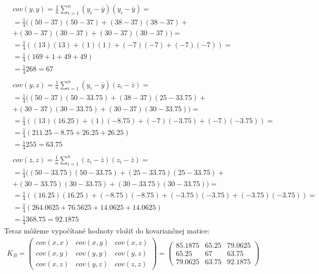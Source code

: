 \documentclass[a4paper]{article}
\begin{document}
	\begin{align*}
		&cov(y,y)=\frac{1}{n}\sum_{i=1}^{n}(y_i-\bar{y})(y_i-\bar{y})=
		\\
		&=\frac{1}{4}((50-37)(50-37)+(38-37)(38-37)+
		\\
		&+(30-37)(30-37)+(30-37)(30-37))=
		\\
		&=\frac{1}{4}((13)(13)+(1)(1)+
		(-7)(-7)+(-7)(-7))=
		\\
		&=\frac{1}{4}(169+1+49+49)
		\\
		&=\frac{1}{4}268=67
		\\
		\\
		&cov(y,z)=\frac{1}{n}\sum_{i=1}^{n}(y_i-\bar{y})(z_i-\bar{z})=
		\\
		&=\frac{1}{4}((50-37)(50-33.75)+(38-37)(25-33.75)+
		\\
		&+(30-37)(30-33.75)+(30-37)(30-33.75))=
		\\
		&=\frac{1}{4}((13)(16.25)+(1)(-8.75)+
		(-7)(-3.75)+(-7)(-3.75))=
		\\
		&=\frac{1}{4}(211.25-8.75+26.25+26.25)
		\\
		&=\frac{1}{4}255=63.75
		\\
		\\
		&cov(z,z)=\frac{1}{n}\sum_{i=1}^{n}(z_i-\bar{z})(z_i-\bar{z})=
		\\
		&=\frac{1}{4}((50-33.75)(50-33.75)+(25-33.75)(25-33.75)+
		\\
		&+(30-33.75)(30-33.75)+(30-33.75)(30-33.75))=
		\\
		&=\frac{1}{4}((16.25)(16.25)+(-8.75)(-8.75)+
		(-3.75)(-3.75)+(-3.75)(-3.75))=
		\\
		&=\frac{1}{4}(264.0625+76.5625+14.0625+14.0625)
		\\
		&=\frac{1}{4}368.75=92.1875
	\end{align*}
	Teraz môžeme vypočítané hodnoty vložiť do kovariančnej matice:
	\begin{align*}
		K_B = \begin{pmatrix}
			cov(x,x) & cov(x,y) & cov(x,z) \\
			cov(x,y) & cov(y,y) & cov(y,z) \\
			cov(x,z) & cov(y,z) & cov(z,z)
		\end{pmatrix} =
		\begin{pmatrix}
			85.1875 & 65.25 & 79.0625 \\
			65.25 & 67 & 63.75 \\
			79.0625 & 63.75 & 92.1875
		\end{pmatrix}
	\end{align*}
	\newpage
\end{document}
